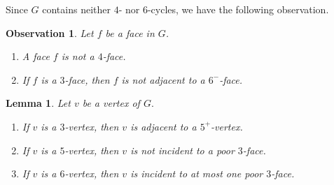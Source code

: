\documentclass[11pt]{amsart} %
\newtheorem{lemma}[theorem]{Lemma}
\newtheorem{observation}[theorem]{Observation}
\theoremstyle{definition}
\begin{document}
Since $G$ contains neither $4$- nor $6$-cycles, 
we have the following observation. 

\begin{observation}\label{face} Let $f$ be a face in $G$. 
	\begin{enumerate}
		\item [\rm (i)] A face $f$ is not a $4$-face.  
		\item [\rm (ii)] If $f$ is a $3$-face, 
		then $f$ is not adjacent to a $6^-$-face.
	\end{enumerate}
\end{observation}



\begin{lemma}\label{forbidvertex} 
    Let $v$ be a vertex of $G.$ 
	\begin{enumerate}
		\item [\rm (i)] If $v$ is a $3$-vertex, 
		        then $v$ is adjacent to a $5^+$-vertex. 
		\item [\rm (ii)] If $v$ is a $5$-vertex, 
		        then $v$ is not incident to a poor $3$-face. 
		\item [\rm (iii)] If $v$ is a $6$-vertex, 
		        then $v$ is incident to at most one poor $3$-face. 
	\end{enumerate}	
\end{lemma}
\end{document}
